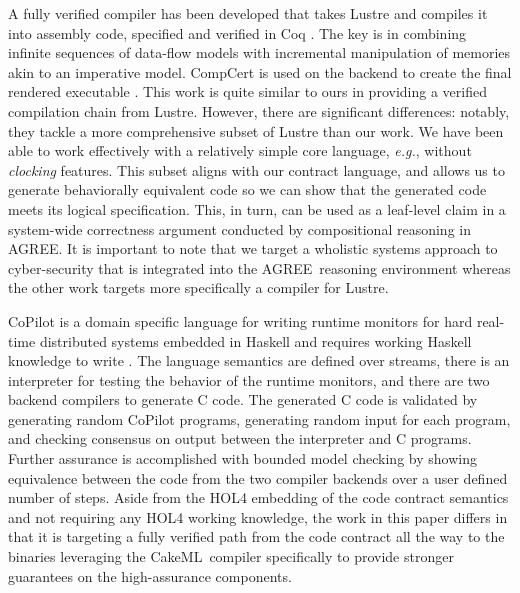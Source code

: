 \documentclass[global,twocolumn]{svjour}
\newcommand{\agr}{AGREE}
\newcommand{\ckml}{CakeML}
\newcommand{\eg}{\textit{e.g.}}
\begin{document}
A fully verified compiler has been developed that takes Lustre and compiles it into assembly code, specified and verified in Coq \cite{10.1145/3140587.3062358}.
%
The key is in combining infinite sequences of data-flow models with incremental manipulation of memories akin to an imperative model.
%
CompCert is used on the backend to create the final rendered executable \cite{compcert}.
%
This work is quite similar to ours in providing a verified compilation chain from Lustre.
%
However, there are significant differences: notably, they tackle a more comprehensive subset of Lustre than our work.
%
We have been able to work effectively with a relatively simple core language, \eg, without \emph{clocking} features.
%
This subset aligns with our contract language, and allows us to generate behaviorally equivalent code so we can show that the generated code meets its logical specification.
%
This, in turn, can be used as a leaf-level claim in a system-wide correctness argument conducted by compositional reasoning in \agr.
%
It is important to note that we target a wholistic systems approach to cyber-security that is integrated into the \agr\ reasoning environment whereas the other work targets more specifically a compiler for Lustre.

CoPilot is a domain specific language for writing runtime monitors for hard real-time distributed systems embedded in Haskell and requires working Haskell knowledge to write \cite{10.1007/s11334-013-0223-x}.
%
The language semantics are defined over streams, there is an interpreter for testing the behavior of the runtime monitors, and there are two backend compilers to generate C code.
%
The generated C code is validated by generating random CoPilot programs, generating random input for each program, and checking consensus on output between the interpreter and C programs.
%
Further assurance is accomplished with bounded model checking by showing equivalence between the code from the two compiler backends over a user defined number of steps.
%
Aside from the HOL4 embedding of the code contract semantics and not requiring any HOL4 working knowledge, the work in this paper differs in that it is targeting a fully verified path from the code contract all the way to the binaries leveraging the \ckml\ compiler specifically to provide stronger guarantees on the high-assurance components.
\end{document}
